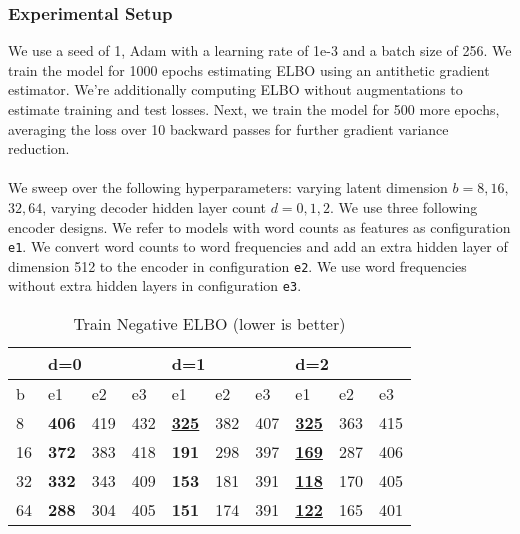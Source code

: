 \subsubsection{Experimental Setup}

We use a seed of 1, Adam with a learning rate of 1e-3 and a batch size of 256. We train the model for 1000 epochs estimating ELBO using an antithetic gradient estimator. We're additionally computing ELBO without augmentations to estimate training and test losses. Next, we train the model for 500 more epochs, averaging the loss over 10 backward passes for further gradient variance reduction.

\paragraph{} We sweep over the following hyperparameters: varying latent dimension $b = 8, 16,$ $ 32, 64$, varying decoder hidden layer count $d = 0, 1, 2$. We use three following encoder designs. We refer to models with word counts as features as configuration \texttt{e1}. We convert word counts to word frequencies and add an extra hidden layer of dimension 512 to the encoder in configuration \texttt{e2}. We use word frequencies without extra hidden layers in configuration \texttt{e3}.

\begin{table}[]
\caption{Train Negative ELBO (lower is better)}
\label{tab:train}
\centering
\begin{tabular}{llllllllll}
\hline
   & \multicolumn{3}{l}{d=0}  & \multicolumn{3}{l}{d=1}        & \multicolumn{3}{l}{d=2}        \\ \hline
b  & e1           & e2  & e3  & e1                 & e2  & e3  & e1                 & e2  & e3  \\ \hline
8  & \textbf{406} & 419 & 432 & {\ul \textbf{325}} & 382 & 407 & {\ul \textbf{325}} & 363 & 415 \\
16 & \textbf{372} & 383 & 418 & \textbf{191}       & 298 & 397 & {\ul \textbf{169}} & 287 & 406 \\
32 & \textbf{332} & 343 & 409 & \textbf{153}       & 181 & 391 & {\ul \textbf{118}} & 170 & 405 \\
64 & \textbf{288} & 304 & 405 & \textbf{151}       & 174 & 391 & {\ul \textbf{122}} & 165 & 401 \\ \hline
\end{tabular}
\end{table}


